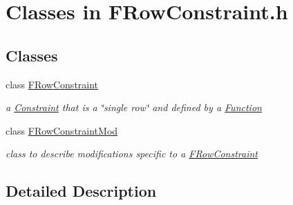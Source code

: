 \hypertarget{group___f_row_constraint___c_l_a_s_s_e_s}{}\section{Classes in F\+Row\+Constraint.\+h}
\label{group___f_row_constraint___c_l_a_s_s_e_s}
\subsection*{Classes}
\begin{DoxyCompactItemize}
\item 
class \mbox{\hyperlink{class_s_m_spp__di__unipi__it_1_1_f_row_constraint}{F\+Row\+Constraint}}
\begin{DoxyCompactList}\small\item\em a \mbox{\hyperlink{class_s_m_spp__di__unipi__it_1_1_constraint}{Constraint}} that is a \char`\"{}single row\char`\"{} and defined by a \mbox{\hyperlink{class_s_m_spp__di__unipi__it_1_1_function}{Function}} \end{DoxyCompactList}\item 
class \mbox{\hyperlink{class_s_m_spp__di__unipi__it_1_1_f_row_constraint_mod}{F\+Row\+Constraint\+Mod}}
\begin{DoxyCompactList}\small\item\em class to describe modifications specific to a \mbox{\hyperlink{class_s_m_spp__di__unipi__it_1_1_f_row_constraint}{F\+Row\+Constraint}} \end{DoxyCompactList}\end{DoxyCompactItemize}


\subsection{Detailed Description}

